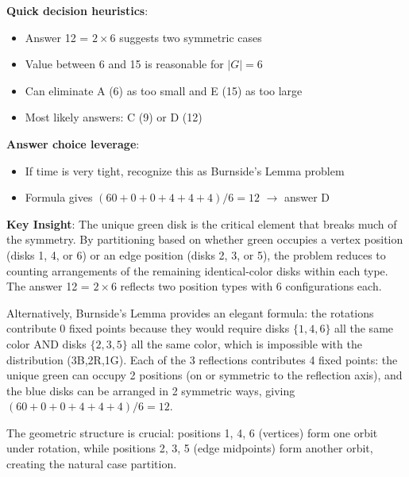 \documentclass[11pt]{article}
\begin{document}
\begin{competitionbox}
\textbf{Quick decision heuristics}:
\begin{itemize}
    \item Answer 12 = $2 \times 6$ suggests two symmetric cases
    \item Value between 6 and 15 is reasonable for $|G| = 6$
    \item Can eliminate A (6) as too small and E (15) as too large
    \item Most likely answers: C (9) or D (12)
\end{itemize}

\textbf{Answer choice leverage}:
\begin{itemize}
    \item If time is very tight, recognize this as Burnside's Lemma problem
    \item Formula gives $(60+0+0+4+4+4)/6 = 12$ $\rightarrow$ answer D
\end{itemize}
\end{competitionbox}

\begin{keyinsightbox}
\textbf{Key Insight}: The unique green disk is the critical element that breaks much of the symmetry. By partitioning based on whether green occupies a vertex position (disks 1, 4, or 6) or an edge position (disks 2, 3, or 5), the problem reduces to counting arrangements of the remaining identical-color disks within each type. The answer 12 = $2 \times 6$ reflects two position types with 6 configurations each.

Alternatively, Burnside's Lemma provides an elegant formula: the rotations contribute 0 fixed points because they would require disks $\{1,4,6\}$ all the same color AND disks $\{2,3,5\}$ all the same color, which is impossible with the distribution (3B,2R,1G). Each of the 3 reflections contributes 4 fixed points: the unique green can occupy 2 positions (on or symmetric to the reflection axis), and the blue disks can be arranged in 2 symmetric ways, giving $(60+0+0+4+4+4)/6 = 12$.

The geometric structure is crucial: positions 1, 4, 6 (vertices) form one orbit under rotation, while positions 2, 3, 5 (edge midpoints) form another orbit, creating the natural case partition.
\end{keyinsightbox}
\end{document}
